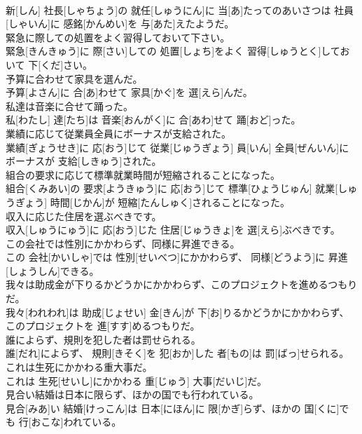\documentclass[8pt]{extreport}
\begin{document}
\begin{CJK}{UTF8}{min}
\\	新[しん] 社長[しゃちょう]の 就任[しゅうにん]に 当[あ]たってのあいさつは 社員[しゃいん]に 感銘[かんめい]を 与[あた]えたようだ。
\\	緊急に際しての処置をよく習得しておいて下さい。	
\\	緊急[きんきゅう]に 際[さい]しての 処置[しょち]をよく 習得[しゅうとく]しておいて 下[くだ]さい。
\\	予算に合わせて家具を選んだ。	
\\	予算[よさん]に 合[あ]わせて 家具[かぐ]を 選[えら]んだ。
\\	私達は音楽に合せて踊った。	
\\	私[わたし] 達[たち]は 音楽[おんがく]に 合[あわ]せて 踊[おど]った。
\\	業績に応じて従業員全員にボーナスが支給された。	
\\	業績[ぎょうせき]に 応[おう]じて 従業[じゅうぎょう] 員[いん] 全員[ぜんいん]にボーナスが 支給[しきゅう]された。
\\	組合の要求に応じて標準就業時間が短縮されることになった。	
\\	組合[くみあい]の 要求[ようきゅう]に 応[おう]じて 標準[ひょうじゅん] 就業[しゅうぎょう] 時間[じかん]が 短縮[たんしゅく]されることになった。
\\	収入に応じた住居を選ぶべきです。	
\\	収入[しゅうにゅう]に 応[おう]じた 住居[じゅうきょ]を 選[えら]ぶべきです。
\\	この会社では性別にかかわらず、同様に昇進できる。	
\\	この 会社[かいしゃ]では 性別[せいべつ]にかかわらず、 同様[どうよう]に 昇進[しょうしん]できる。
\\	我々は助成金が下りるかどうかにかかわらず、このプロジェクトを進めるつもりだ。	
\\	我々[われわれ]は 助成[じょせい] 金[きん]が 下[お]りるかどうかにかかわらず、このプロジェクトを 進[すす]めるつもりだ。
\\	誰によらず、規則を犯した者は罰せられる。	
\\	誰[だれ]によらず、 規則[きそく]を 犯[おか]した 者[もの]は 罰[ばっ]せられる。
\\	これは生死にかかわる重大事だ。	
\\	これは 生死[せいし]にかかわる 重[じゅう] 大事[だいじ]だ。
\\	見合い結婚は日本に限らず、ほかの国でも行われている。	
\\	見合[みあ]い 結婚[けっこん]は 日本[にほん]に 限[かぎ]らず、ほかの 国[くに]でも 行[おこな]われている。

\end{CJK}
\end{document}
